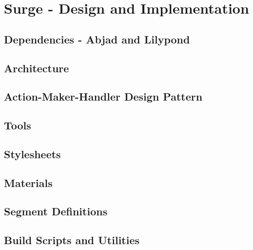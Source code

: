 \chapter{Surge - Design and Implementation}
\section{Dependencies - Abjad and Lilypond}
\section{Architecture}
\section{Action-Maker-Handler Design Pattern}
\section{Tools}
\section{Stylesheets}
\section{Materials}
\section{Segment Definitions}
\section{Build Scripts and Utilities}

